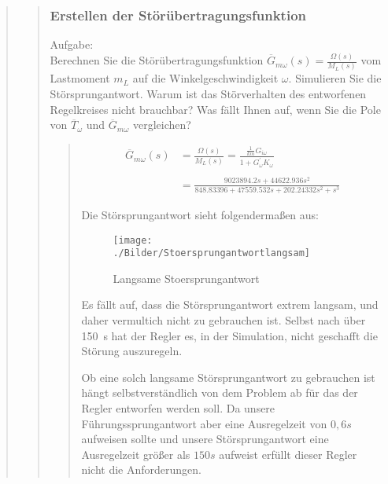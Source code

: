 \begin{quote}
\begin{quote}
        \subsubsection{Erstellen der Störübertragungsfunktion}
        \label{2e}
        Aufgabe:\\
        Berechnen Sie die Störübertragungsfunktion $\overline{G}_{m\omega} (s) = \frac{\Omega(s)}{M_L (s)}$ vom
        Lastmoment $m_L$ auf die Winkelgeschwindigkeit $\omega$. Simulieren Sie die Störsprungantwort. Warum ist das
        Störverhalten des entworfenen Regelkreises nicht brauchbar? Was fällt Ihnen auf, wenn Sie die Pole von
        $\overline{T}_\omega$ und $\overline{G}_{m\omega}$ vergleichen?
		\begin{quote}
			\begin{equation*}
            	\begin{split}
            		\overline{G}_{m\omega} (s) &= \frac{\Omega(s)}{M_L (s)} = \frac{\frac{1}{km}G_{i\omega}}{1+ G_\omega^{'}
            		K_\omega}\\ \\
            		&= \frac{9023894.2s + 44622.936s^2}{848.83396 + 47559.532s + 202.24332s^2 + s^3}
            	\end{split}
            \end{equation*}
            
            Die Störsprungantwort sieht folgendermaßen aus:
            \begin{figure}[H]
                \centering
                    \texttt{[image: ./Bilder/Stoersprungantwortlangsam]}
                        \caption{Langsame Stoersprungantwort}
                        \label{fig:filename}
            \end{figure}
            
            Es fällt auf, dass die Störsprungantwort extrem langsam, und daher vermultich nicht zu gebrauchen ist. Selbst
            nach über \SI{150}{s} hat der Regler es, in der Simulation, nicht geschafft die Störung auszuregeln.\vspace{1em}
            
            Ob eine solch langsame Störsprungantwort zu gebrauchen ist hängt selbstverständlich von dem Problem ab für
            das der Regler entworfen werden soll. Da unsere Führungssprungantwort aber eine Ausregelzeit von $0,6s$
            aufweisen sollte und unsere Störsprungantwort eine Ausregelzeit größer als $150 s$ aufweist erfüllt
            dieser Regler nicht die Anforderungen.\vspace{1em}
            

\end{quote}
\end{quote}
\end{quote}
